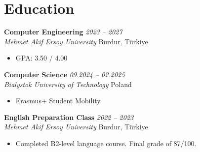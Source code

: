 \section{Education}

\textbf{Computer Engineering} \hfill \textit{2023 -- 2027} \\
\textit{Mehmet Akif Ersoy University} \hfill Burdur, Türkiye
\begin{itemize}[leftmargin=1.5em, itemsep=0pt, topsep=2pt]
  \item GPA: 3.50 / 4.00
\end{itemize}

\vspace{0.4em}

\textbf{Computer Science} \hfill \textit{09.2024 -- 02.2025} \\
\textit{Bialystok University of Technology} \hfill Poland
\begin{itemize}[leftmargin=1.5em, itemsep=0pt, topsep=2pt]
  \item Erasmus+ Student Mobility
\end{itemize}

\vspace{0.4em}

\textbf{English Preparation Class} \hfill \textit{2022 -- 2023} \\
\textit{Mehmet Akif Ersoy University} \hfill Burdur, Türkiye
\begin{itemize}[leftmargin=1.5em, itemsep=0pt, topsep=2pt]
  \item Completed B2-level language course. Final grade of 87/100.
\end{itemize}
